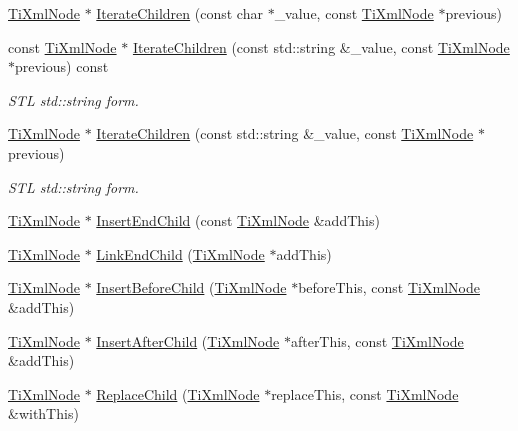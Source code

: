 \begin{DoxyCompactItemize}
\hyperlink{class_ti_xml_node}{Ti\-Xml\-Node} $\ast$ \hyperlink{class_ti_xml_node_a67ba8275e533e6f76340236c42ea0aea}{Iterate\-Children} (const char $\ast$\-\_\-value, const \hyperlink{class_ti_xml_node}{Ti\-Xml\-Node} $\ast$previous)
\item 
const \hyperlink{class_ti_xml_node}{Ti\-Xml\-Node} $\ast$ \hyperlink{class_ti_xml_node_a1cbaaf8e82c09ad763d52616d75724df}{Iterate\-Children} (const std\-::string \&\-\_\-value, const \hyperlink{class_ti_xml_node}{Ti\-Xml\-Node} $\ast$previous) const 
\begin{DoxyCompactList}\small\item\em S\-T\-L std\-::string form. \end{DoxyCompactList}\item 
\hyperlink{class_ti_xml_node}{Ti\-Xml\-Node} $\ast$ \hyperlink{class_ti_xml_node_a16e9ad53e2f5445b14bf325c90aa862c}{Iterate\-Children} (const std\-::string \&\-\_\-value, const \hyperlink{class_ti_xml_node}{Ti\-Xml\-Node} $\ast$previous)
\begin{DoxyCompactList}\small\item\em S\-T\-L std\-::string form. \end{DoxyCompactList}\item 
\hyperlink{class_ti_xml_node}{Ti\-Xml\-Node} $\ast$ \hyperlink{class_ti_xml_node_af287a913ce46d8dbf7ef24fec69bbaf0}{Insert\-End\-Child} (const \hyperlink{class_ti_xml_node}{Ti\-Xml\-Node} \&add\-This)
\item 
\hyperlink{class_ti_xml_node}{Ti\-Xml\-Node} $\ast$ \hyperlink{class_ti_xml_node_a1a881212554b759865f6cac79a851d38}{Link\-End\-Child} (\hyperlink{class_ti_xml_node}{Ti\-Xml\-Node} $\ast$add\-This)
\item 
\hyperlink{class_ti_xml_node}{Ti\-Xml\-Node} $\ast$ \hyperlink{class_ti_xml_node_a71e54e393336382bc9875f64aab5cb15}{Insert\-Before\-Child} (\hyperlink{class_ti_xml_node}{Ti\-Xml\-Node} $\ast$before\-This, const \hyperlink{class_ti_xml_node}{Ti\-Xml\-Node} \&add\-This)
\item 
\hyperlink{class_ti_xml_node}{Ti\-Xml\-Node} $\ast$ \hyperlink{class_ti_xml_node_a274db3292218202805c093f66a964cb5}{Insert\-After\-Child} (\hyperlink{class_ti_xml_node}{Ti\-Xml\-Node} $\ast$after\-This, const \hyperlink{class_ti_xml_node}{Ti\-Xml\-Node} \&add\-This)
\item 
\hyperlink{class_ti_xml_node}{Ti\-Xml\-Node} $\ast$ \hyperlink{class_ti_xml_node_a543208c2c801c84a213529541e904b9f}{Replace\-Child} (\hyperlink{class_ti_xml_node}{Ti\-Xml\-Node} $\ast$replace\-This, const \hyperlink{class_ti_xml_node}{Ti\-Xml\-Node} \&with\-This)

\end{DoxyCompactItemize}
